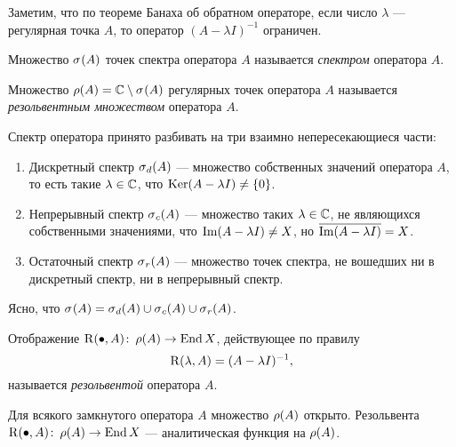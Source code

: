 Заметим, что по теореме Банаха об обратном операторе, если число $\lambda$ --- регулярная точка
$A$, то оператор $(A - \lambda I)^{-1}$ ограничен.

\begin{definition}
    Множество $\spectrum{A}$ точек спектра оператора $A$ называется \emph{спектром} оператора $A$.
\end{definition}   

\begin{definition}
    Множество $\resset{A} = \fieldc \setminus \spectrum{A}$ регулярных точек оператора $A$
    называется \emph{резольвентным множеством} оператора $A$.
\end{definition}

Спектр оператора принято разбивать на три взаимно непересекающиеся части:
\begin{enumerate}
    \item Дискретный спектр $\spectrum[d]{A}$ --- множество собственных значений оператора $A$, то есть такие $\lambda \in \fieldc$, что $\ker (A - \lambda I) \neq \menge{0}$.
    \item Непрерывный спектр $\spectrum[c]{A}$ --- множество таких $\lambda \in \fieldc$, не
    являющихся собственными значениями, что $\im (A - \lambda I) \neq X$, но 
    $\overline{\im (A - \lambda I)} = X$.
    \item Остаточный спектр $\spectrum[r]{A}$ --- множество точек спектра, не вошедших ни в
    дискретный спектр, ни в непрерывный спектр.
\end{enumerate}

Ясно, что $\spectrum{A} = \spectrum[d]{A} \cup \spectrum[c]{A} \cup \spectrum[r]{A}$.
\begin{definition}
    Отображение $\resolvent{\bullet}{A} \colon \resset{A} \to \End X$, действующее по правилу
    \[ \resolvent{\lambda}{A} = (A - \lambda I)^{-1}, \]
    называется \emph{резольвентой} оператора $A$.
\end{definition}

\begin{theorem}\label{th:resanalytic}
    Для всякого замкнутого оператора $A$ множество $\resset{A}$ открыто.
    Резольвента $\resolvent{\bullet}{A} \colon \resset{A} \to \End X$ --- аналитическая функция
    на $\resset{A}$.
\end{theorem}

